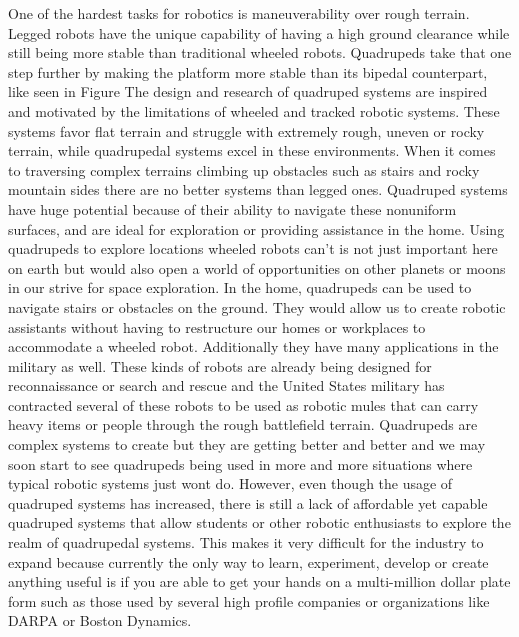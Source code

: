     
One of the hardest tasks for robotics is maneuverability over rough terrain. Legged robots have the unique capability of having a high ground clearance while still being more stable than traditional wheeled robots. Quadrupeds take that one step further by making the platform more stable than its bipedal counterpart, like seen in Figure %
The design and research of quadruped systems are inspired and motivated by the limitations of wheeled and tracked robotic systems. These systems favor flat terrain and struggle with extremely rough, uneven or rocky terrain, while quadrupedal systems excel in these environments. When it comes to traversing complex terrains climbing up obstacles such as stairs and rocky mountain sides there are no better systems than legged ones. Quadruped systems have huge potential because of their ability to navigate these nonuniform surfaces, and are ideal for exploration or providing assistance in the home. Using quadrupeds to explore locations wheeled robots can't is not just important here on earth but would also open a world of opportunities on other planets or moons in our strive for space exploration. In the home, quadrupeds can be used to navigate stairs or obstacles on the ground. They would allow us to create robotic assistants without having to restructure our homes or workplaces to accommodate a wheeled robot. Additionally they have many applications in the military as well. These kinds of robots are already being designed for reconnaissance or search and rescue and the United States military has contracted several of these robots to be used as robotic mules that can carry heavy items or people through the rough battlefield terrain. Quadrupeds are complex systems to create but they are getting better and better and we may soon start to see quadrupeds being used in more and more situations where typical robotic systems just wont do. However, even though the usage of quadruped systems has increased, there is still a lack of affordable yet capable quadruped systems that allow students or other robotic enthusiasts to explore the realm of quadrupedal systems. This makes it very difficult for the industry to expand because currently the only way to learn, experiment, develop or create anything useful is if you are able to get your hands on a multi-million dollar plate form such as those used by several high profile companies or organizations like DARPA or Boston Dynamics. 


